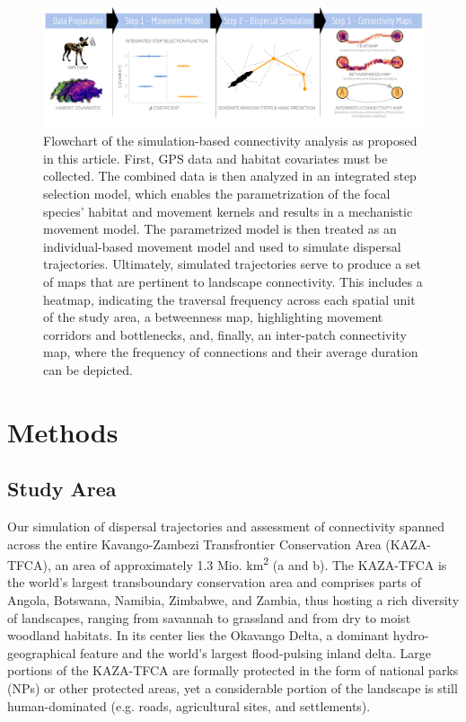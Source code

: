 \documentclass[abstract=on,10pt,a4paper,bibliography=totocnumbered]{article}
\begin{document}
\begin{figure}[htbp]
  \begin{center}
    \includegraphics[width = \textwidth]{99_GraphicalAbstract2.pdf}
    \caption{Flowchart of the simulation-based connectivity analysis as proposed
    in this article. First, GPS data and habitat covariates must be
    collected. The combined data is then analyzed in an integrated step
    selection model, which enables the parametrization of the focal species'
    habitat and movement kernels and results in a mechanistic movement model.
    The parametrized model is then treated as an individual-based movement model
    and used to simulate dispersal trajectories. Ultimately, simulated
    trajectories serve to produce a set of maps that are pertinent to landscape
    connectivity. This includes a heatmap, indicating the traversal frequency
    across each spatial unit of the study area, a betweenness map, highlighting
    movement corridors and bottlenecks, and, finally, an inter-patch
    connectivity map, where the frequency of connections and their average
    duration can be depicted.}
    \label{GraphicalAbstract}
  \end{center}
\end{figure}

\section{Methods}
\subsection{Study Area}
Our simulation of dispersal trajectories and assessment of connectivity spanned
across the entire Kavango-Zambezi Transfrontier Conservation Area (KAZA-TFCA),
an area of approximately 1.3 Mio. km\textsuperscript{2} (a and
b). The KAZA-TFCA is the world's largest transboundary conservation area and
comprises parts of Angola, Botswana, Namibia, Zimbabwe, and Zambia, thus hosting
a rich diversity of landscapes, ranging from savannah to grassland and from dry
to moist woodland habitats. In its center lies the Okavango Delta, a dominant
hydro-geographical feature and the world's largest flood-pulsing inland delta.
Large portions of the KAZA-TFCA are formally protected in the form of national
parks (NPs) or other protected areas, yet a considerable portion of the
landscape is still human-dominated (e.g. roads, agricultural sites, and
settlements).
\end{document}
